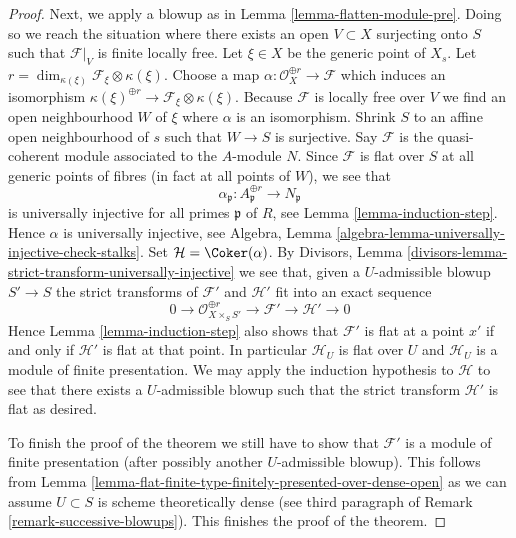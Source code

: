 \begin{proof}
\medskip\noindent
Next, we apply a blowup as in Lemma \ref{lemma-flatten-module-pre}.
Doing so we reach the situation where there exists an
open $V \subset X$ surjecting onto $S$ such that $\mathcal{F}|_V$
is finite locally free. Let $\xi \in X$ be the generic point of $X_s$. Let
$r = \dim_{\kappa(\xi)} \mathcal{F}_\xi \otimes \kappa(\xi)$.
Choose a map $\alpha : \mathcal{O}_X^{\oplus r} \to \mathcal{F}$
which induces an isomorphism
$\kappa(\xi)^{\oplus r} \to \mathcal{F}_\xi \otimes \kappa(\xi)$.
Because $\mathcal{F}$ is locally free over $V$ we find an open neighbourhood
$W$ of $\xi$ where $\alpha$ is an isomorphism. Shrink $S$ to an affine open
neighbourhood of $s$ such that $W \to S$ is surjective. Say $\mathcal{F}$
is the quasi-coherent module associated to the $A$-module $N$. Since
$\mathcal{F}$ is flat over $S$ at all generic points of fibres
(in fact at all points of $W$), we see that
$$
\alpha_\mathfrak p : A_\mathfrak p^{\oplus r} \to N_\mathfrak p
$$
is universally injective for all primes $\mathfrak p$ of $R$, see
Lemma \ref{lemma-induction-step}. Hence $\alpha$ is universally injective,
see Algebra, Lemma \ref{algebra-lemma-universally-injective-check-stalks}.
Set $\mathcal{H} = \Coker(\alpha)$.
By Divisors, Lemma \ref{divisors-lemma-strict-transform-universally-injective}
we see that, given a $U$-admissible blowup $S' \to S$
the strict transforms of $\mathcal{F}'$ and $\mathcal{H}'$
fit into an exact sequence
$$
0 \to \mathcal{O}_{X \times_S S'}^{\oplus r} \to \mathcal{F}'
\to \mathcal{H}' \to 0
$$
Hence Lemma \ref{lemma-induction-step} also shows that $\mathcal{F}'$
is flat at a point $x'$ if and only if
$\mathcal{H}'$ is flat at that point. In particular $\mathcal{H}_U$ is
flat over $U$ and $\mathcal{H}_U$ is a module of finite presentation.
We may apply the induction hypothesis to $\mathcal{H}$ to see that
there exists a $U$-admissible blowup such that the strict transform
$\mathcal{H}'$ is flat as desired.

\medskip\noindent
To finish the proof of the theorem we still have to show that $\mathcal{F}'$
is a module of finite presentation (after possibly another
$U$-admissible blowup). This follows from
Lemma \ref{lemma-flat-finite-type-finitely-presented-over-dense-open}
as we can assume $U \subset S$ is scheme theoretically dense (see
third paragraph of Remark \ref{remark-successive-blowups}).
This finishes the proof of the theorem.
\end{proof}





